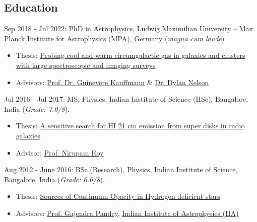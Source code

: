 \documentclass[11pt,letterpaper]{article}
\begin{document}
\subsection{Education}
\begin{list}{}{\cvlist}
  \item Sep 2018 - Jul 2022: PhD in Astrophysics, Ludwig Maximilian University -- Max Planck Institute for Astrophysics (MPA), Germany (\emph{magna cum laude})
\begin{itemize}
    \item Thesis: \href{https://edoc.ub.uni-muenchen.de/30337/}{Probing cool and warm circumgalactic gas in galaxies and clusters with large spectroscopic and imaging surveys}
    \item Advisors: \href{https://www.mpa-garching.mpg.de/galaxyformation}{Prof. Dr. Guinevere Kauffmann} \& \href{https://www.ita.uni-heidelberg.de/~dnelson/}{Dr. Dylan Nelson}
\end{itemize}

\item Jul 2016 - Jul 2017: MS, Physics, Indian Institute of Science (IISc), Bangalore, India (\emph{Grade: 7.0/8}).
\begin{itemize}
    \item Thesis: \href{https://raw.githubusercontent.com/abhi0395/mycv/main/files/MS_thesis.pdf}{A sensitive search for HI 21 cm emission from super disks in radio galaxies}
      \vspace{-1mm}
    \item Advisor: \href{http://www.physics.iisc.ernet.in/%7Enroy/}{Prof. Nirupam Roy}
  \end{itemize}
\item Aug 2012 - June 2016: BSc (Research), Physics, Indian Institute of Science, Bangalore, India (\emph{Grade: 6.6/8}).
\begin{itemize}
    \item Thesis: \href{https://raw.githubusercontent.com/abhi0395/mycv/main/files/BS_thesis.pdf}{Sources of Continuum Opacity in Hydrogen deficient stars}
      \vspace{-1mm}
    \item Advisors: \href{https://www.iiap.res.in/?q=user/29}{Prof. Gajendra Pandey}, \href{https://www.iiap.res.in/}{Indian Institute of Astrophysics (IIA)}
  \end{itemize}
\end{list}

\vspace{-1.5mm}
\end{document}
